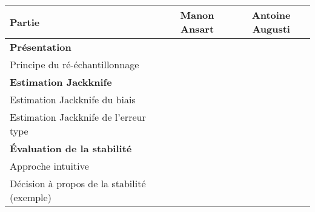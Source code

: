 \documentclass[a4paper,10pt]{article}
\newcommand{\hlineGras}{\Xhline{2\arrayrulewidth}}
\begin{document}
	\vspace{10px}
	\begin{center}
		\begin{tabular}
		{| l || c | c |} \hline
		Partie & Manon Ansart & Antoine Augusti \\ \hline \hline
		\textbf{Présentation} & & \\ \hline
		Principe du ré-échantillonnage & \checkmark & \checkmark \\ \hline
		\hlineGras
		\textbf{Estimation Jackknife} & & \\ \hline
		Estimation Jackknife du biais  & & \checkmark  \\ \hline
		Estimation Jackknife de l'erreur type & \checkmark &  \\ \hline
		\hlineGras
		\textbf{Évaluation de la stabilité} & & \\ \hline
		Approche intuitive  & & \checkmark \\ \hline
		Décision à propos de la stabilité (exemple)  & & \checkmark \\ \hline
		\end{tabular}
	\end{center}
\end{document}
